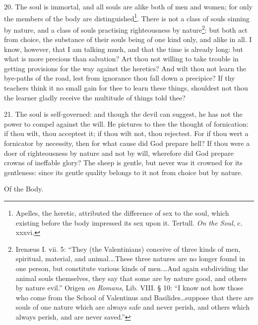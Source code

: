 20. The soul is immortal, and all souls are alike both of men and women; for only the members of the body are distinguished\footnote{Apelles, the heretic, attributed the difference of sex to the soul, which existing before the body impressed its sex upon it. Tertull. \emph{On the Soul}, c. xxxvi.}. There is not a class of souls sinning by nature, and a class of souls practising righteousness by nature\footnote{Irenæus I. vii. 5: “They (the Valentinians) conceive of three kinds of men, spiritual, material, and animal.…These three natures are no longer found in one person, but constitute various kinds of men.…And again subdividing the animal souls themselves, they say that some are by nature good, and others by nature evil.” Origen \emph{on Romans}, Lib. VIII. § 10: “I know not how those who come from the School of Valentinus and Basilides…suppose that there are souls of one nature which are always safe and never perish, and others which always perish, and are never saved.”}: but both act from choice, the substance of their souls being of one kind only, and alike in all. I know, however, that I am talking much, and that the time is already long: but what is more precious than salvation? Art thou not willing to take trouble in getting provisions for the way against the heretics? And wilt thou not learn the bye-paths of the road, lest from ignorance thou fall down a precipice? If thy teachers think it no small gain for thee to learn these things, shouldest not thou the learner gladly receive the multitude of things told thee?

21. The soul is self-governed: and though the devil can suggest, he has not the power to compel against the will. He pictures to thee the thought of fornication: if thou wilt, thou acceptest it; if thou wilt not, thou rejectest. For if thou wert a fornicator by necessity, then for what cause did God prepare hell? If thou were a doer of righteousness by nature and not by will, wherefore did God prepare crowns of ineffable glory? The sheep is gentle, but never was it crowned for its gentleness: since its gentle quality belongs to it not from choice but by nature.

Of the Body.

